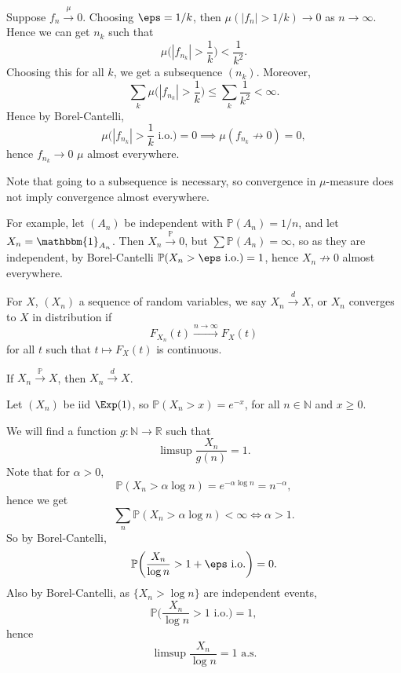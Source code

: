 \documentclass[12pt]{article}
\begin{document}
\begin{proofbox}
	Suppose $f_n \overset{\mu}{\to} 0$. Choosing $\eps = 1/k$, then $\mu(|f_n| > 1/k) \to 0$ as $n \to \infty$. Hence we can get $n_k$ such that
	\[
	\mu\biggl(|f_{n_k}| > \frac{1}{k}\biggr) < \frac{1}{k^2}.
	\]
	Choosing this for all $k$, we get a subsequence $(n_k)$. Moreover,
	\[
	\sum_k \mu\biggl(|f_{n_k}| > \frac{1}{k}\biggr) \le \sum_k \frac{1}{k^2} < \infty.
	\]
	Hence by Borel-Cantelli,
	\[
		\mu\biggl(|f_{n_k}| > \frac{1}{k} \text{ i.o.}\biggr) = 0 \implies \mu(f_{n_k} \not \to 0) = 0,
	\]
	hence $f_{n_k} \to 0$ $\mu$ almost everywhere.
\end{proofbox}

Note that going to a subsequence is necessary, so convergence in $\mu$-measure does not imply convergence almost everywhere.

For example, let $(A_n)$ be independent with $\mathbb{P}(A_n) = 1/n$, and let $X_n = \mathbbm{1}_{A_n}$. Then $X_n \overset{\mathbb{P}}{\to} 0$, but $\sum \mathbb{P}(A_n) = \infty$, so as they are independent, by Borel-Cantelli $\mathbb{P}(X_n > \eps \text{ i.o.}) = 1$, hence $X_n \not \to 0$ almost everywhere.

For $X$, $(X_n)$ a sequence of random variables, we say $X_n \overset d{\to} X$, or $X_n$ converges to $X$ in distribution if
\[
	F_{X_n}(t) \overset{n \to \infty}{\longrightarrow} F_X(t)
\]
for all $t$ such that $t \mapsto F_X(t)$ is continuous.

\begin{remark}
	If $X_n \overset{\mathbb{P}}{\to} X$, then $X_n \overset d{\to} X$.
\end{remark}

\begin{exbox}
	Let $(X_n)$ be iid $\Exp(1)$, so $\mathbb{P}(X_n > x) = e^{-x}$, for all $n \in \mathbb{N}$ and $x \geq 0$.

	We will find a function $g : \mathbb{N} \to \mathbb{R}$ such that
	\[
	\limsup \frac{X_n}{g(n)} = 1.
	\]
	Note that for $\alpha > 0$,
	\[
	\mathbb{P}(X_n > \alpha \log n) = e^{-\alpha \log n} = n^{-\alpha},
	\]
	hence we get
	\[
	\sum_n \mathbb{P}(X_n > \alpha \log n) < \infty \iff \alpha > 1.
	\]
	So by Borel-Cantelli,
	\[
		\mathbb{P}\biggl(\frac{X_n}{\log n} > 1 + \eps \text{ i.o.}\biggr) = 0.
	\]
	Also by Borel-Cantelli, as $\{X_n > \log n\}$ are independent events,
	\[
		\mathbb{P}\biggl(\frac{X_n}{\log n} > 1 \text{ i.o.} \biggr) = 1,
	\]
	hence
	\[
		\limsup \frac{X_n}{\log n} = 1 \text{ a.s.}
	\]
\end{exbox}
\end{document}
